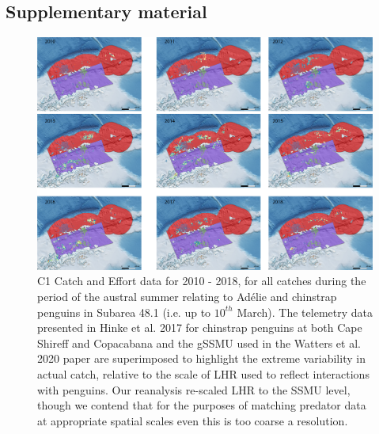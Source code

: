 \documentclass[]{elsarticle} %
\newcommand{\blandscape}{\begin{landscape}}
\newcommand{\elandscape}{\end{landscape}}
\newcommand{\beginsupplement}{\setcounter{table}{0}  \renewcommand{\thetable}{S\arabic{table}}     \setcounter{figure}{0} \renewcommand{\thefigure}{S\arabic{figure}}}
\begin{document}
\newpage  
\beginsupplement
\blandscape

\hypertarget{supplementary-material}{%
\section{Supplementary material}\label{supplementary-material}}

\begin{figure}
\includegraphics[width=0.8\linewidth]{./Watters EMM figures/summer catch/Year by year catch} \caption{C1 Catch and Effort data for 2010 - 2018, for all catches during the period of the austral summer relating to Adélie and chinstrap penguins in Subarea 48.1 (i.e. up to $10^{th}$ March).  The telemetry data presented in Hinke et al. 2017 for chinstrap penguins at both Cape Shireff and Copacabana and the gSSMU used in the Watters et al. 2020 paper are superimposed to highlight the extreme variability in actual catch, relative to the scale of LHR used to reflect interactions with penguins.  Our reanalysis re-scaled LHR to the SSMU level, though we contend that for the purposes of matching predator data at appropriate spatial scales even this is too coarse a resolution.}\label{fig:Supplementary Figure 1}
\end{figure}
\elandscape
\end{document}

